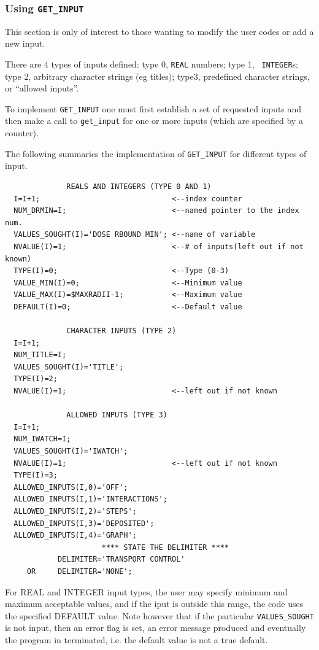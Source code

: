 \documentclass[12pt,twoside]{article}  %
\begin{document}
\subsubsection{Using {\tt GET\_INPUT}}

This section is only of interest to those wanting to modify the user codes
or add a new input.

There are 4 types of inputs defined: type 0, {\tt REAL} numbers; type 1, {\tt
INTEGER}s; type 2,  arbitrary character strings (eg
titles); type3, predefined
character strings, or ``allowed inputs''.

To implement \verb+GET_INPUT+ one must first establish a set of requested
inputs and then make a call to {\tt get\_input} for one or more inputs
(which are specified by a counter).

The following summaries the implementation of \verb+GET_INPUT+ for
different types of input.
\begin{verbatim}
              REALS AND INTEGERS (TYPE 0 AND 1)
  I=I+1;                              <--index counter
  NUM_DRMIN=I;                        <--named pointer to the index num.
  VALUES_SOUGHT(I)='DOSE RBOUND MIN'; <--name of variable
  NVALUE(I)=1;                        <--# of inputs(left out if not known)
  TYPE(I)=0;                          <--Type (0-3)
  VALUE_MIN(I)=0;                     <--Minimum value
  VALUE_MAX(I)=$MAXRADII-1;           <--Maximum value
  DEFAULT(I)=0;                       <--Default value

              CHARACTER INPUTS (TYPE 2)
  I=I+1;
  NUM_TITLE=I;
  VALUES_SOUGHT(I)='TITLE';
  TYPE(I)=2;
  NVALUE(I)=1;                        <--left out if not known

              ALLOWED INPUTS (TYPE 3)
  I=I+1;
  NUM_IWATCH=I;
  VALUES_SOUGHT(I)='IWATCH';
  NVALUE(I)=1;                        <--left out if not known
  TYPE(I)=3;
  ALLOWED_INPUTS(I,0)='OFF';
  ALLOWED_INPUTS(I,1)='INTERACTIONS';
  ALLOWED_INPUTS(I,2)='STEPS';
  ALLOWED_INPUTS(I,3)='DEPOSITED';
  ALLOWED_INPUTS(I,4)='GRAPH';
                      **** STATE THE DELIMITER ****
            DELIMITER='TRANSPORT CONTROL'
     OR     DELIMITER='NONE';
\end{verbatim}
For REAL and INTEGER input types, the user may specify minimum and
maximum acceptable values, and if the iput is outside this range,
the code uses the specified DEFAULT value. Note however that if the
particular \verb+VALUES_SOUGHT+ is not input, then an error flag is set,
an error message produced and eventually the program in terminated,
i.e. the default value is not a true default.
\end{document}

